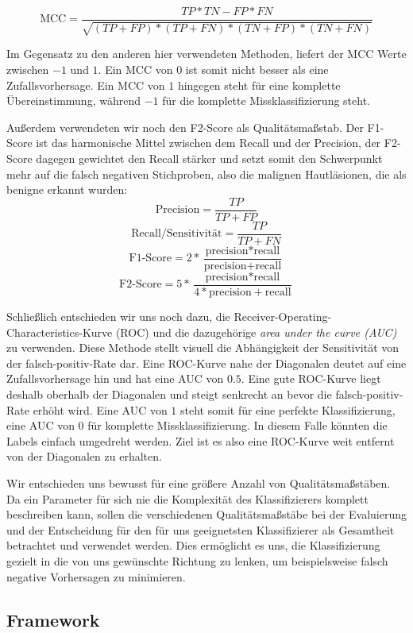 \[\text{MCC} = \frac{TP*TN - FP*FN}{\sqrt{(TP+FP)*(TP+FN)*(TN+FP)*(TN+FN)}}\]

Im Gegensatz zu den anderen hier verwendeten Methoden, liefert der MCC Werte zwischen $-1$ und $1$. Ein MCC von $0$ ist somit nicht besser als eine Zufallsvorhersage. Ein MCC von $1$ hingegen steht für eine komplette Übereinstimmung, während $-1$ für die komplette Missklassifizierung steht.

Außerdem verwendeten wir noch den F2-Score als Qualitätsmaßstab. Der F1-Score ist das harmonische Mittel zwischen dem Recall und der Precision, der F2-Score dagegen gewichtet den Recall stärker und setzt somit den Schwerpunkt mehr auf die falsch negativen Stichproben, also die malignen Hautläsionen, die als benigne erkannt wurden:
	\[\text{Precision} = \frac{TP}{TP+FP}\]
    \[\text{Recall/Sensitivität} = \frac{TP}{TP+FN}\]
	\[\text{F1-Score} = 2*\frac{\text{precision}*\text{recall}}	{\text{precision}+\text{recall}}\]
   	\[\text{F2-Score} = 5*\frac{\text{precision}*\text{recall}}	{4*\text{precision}+\text{recall}}\]
    
Schließlich entschieden wir uns noch dazu, die Receiver-Operating-Characteristics-Kurve (ROC) und die dazugehörige \textit{area under the curve (AUC)} zu verwenden. Diese Methode stellt visuell die Abhängigkeit der Sensitivität von der falsch-positiv-Rate dar. Eine ROC-Kurve nahe der Diagonalen deutet auf eine Zufallsvorhersage hin und hat eine AUC von $0.5$. Eine gute ROC-Kurve liegt deshalb oberhalb der Diagonalen und steigt senkrecht an bevor die falsch-positiv-Rate erhöht wird. Eine AUC von $1$ steht somit für eine perfekte Klassifizierung, eine AUC von $0$ für komplette Missklassifizierung. In diesem Falle könnten die Labels einfach umgedreht werden. Ziel ist es also eine ROC-Kurve weit entfernt von der Diagonalen zu erhalten.
    
Wir entschieden uns bewusst für eine größere Anzahl von Qualitätsmaßstäben. Da ein Parameter für sich nie die Komplexität des Klassifizierers komplett beschreiben kann, sollen die verschiedenen Qualitätsmaßstäbe bei der Evaluierung und der Entscheidung für den für uns geeignetsten Klassifizierer als Gesamtheit betrachtet und verwendet werden. Dies ermöglicht es uns, die Klassifizierung gezielt in die von uns gewünschte Richtung zu lenken, um beispielsweise falsch negative Vorhersagen zu minimieren.

\subsection{Framework}

